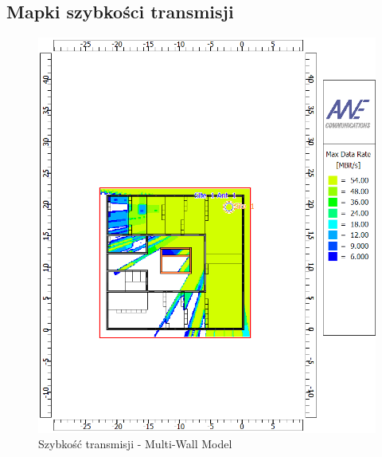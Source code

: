 \documentclass[12pt, a4paper, oneside]{article}
\begin{document}
\subsection{Mapki szybkości transmisji}
\begin{figure}[h]
\centering
\caption{Szybkość transmisji - Multi-Wall Model}
\includegraphics[scale=0.63]{MWM_RATE.png}
\end{figure}
\end{document}
